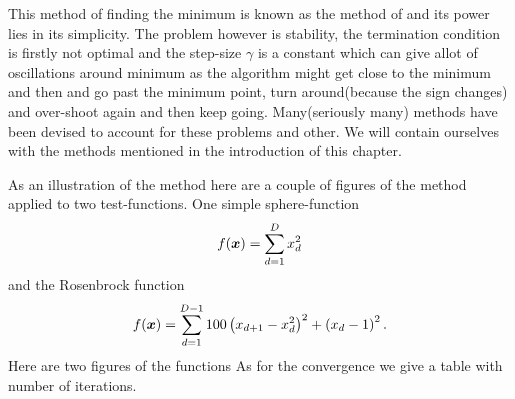     This method of finding the minimum is known as the method of
     and its power lies in its simplicity. The problem
    however is stability, the termination condition is firstly not optimal and
    the step-size $\gamma$ is a constant which can give allot of oscillations
    around minimum as the algorithm might get close to the minimum and then
     and go past the minimum point, turn around(because the
    sign changes) and over-shoot again and then keep going.  Many(seriously
    many) methods have been devised to account for these problems and other. We
    will contain ourselves with the methods mentioned in the introduction of
    this chapter.

    As an illustration of the method here are a couple of figures of the method
    applied to two test-functions. One simple sphere-function
        \begin{equation}
            f(\blds{x}) = \suml{d=1}{D} x^2_d
        \end{equation}
    and the Rosenbrock function
        \begin{equation}
            f(\blds{x}) = \suml{d=1}{D-1} 100\left(x_{d+1} - x^2_d\right)^2 +
            \left(x_d - 1\right)^2.
        \end{equation}
    Here are two figures of the functions
    As for the convergence we give a table with number of iterations.
